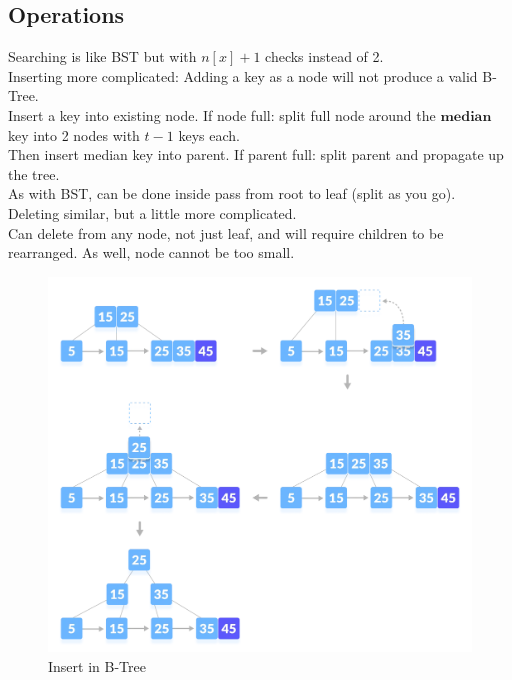 \documentclass{article}
\begin{document}
\subsection{Operations}
Searching is like BST but with $n[x] + 1$ checks instead of 2.\\
Inserting more complicated: Adding a key as a node will not produce a valid B-Tree.\\
Insert a key into existing node. If node full: split full node around the $\textbf{median}$ key into 2 nodes with $t-1$ keys each.\\
Then insert median key into parent. If parent full: split parent and propagate up the tree.\\
As with BST, can be done inside pass from root to leaf (split as you go).\\
Deleting similar, but a little more complicated.\\
Can delete from any node, not just leaf, and will require children to be rearranged. As well, node cannot be too small.\\
\begin{figure}[htp]
    \includegraphics[width=\textwidth]{insert-5-b+tree.png}
    \caption{Insert in B-Tree}
    \label{tab:placeholder}
    
\end{figure}
\end{document}
